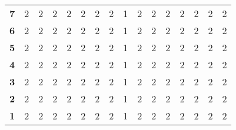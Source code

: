 \documentclass{article}
\begin{document}
\begin{table}[H]
\begin{tabular}{llllllllllllllll}
\multicolumn{1}{l|}{\textbf{7}}  & 2          & 2          & 2          & 2          & 2          & 2          & 2          & 1          & 2          & 2          & 2          & 2          & 2          & 2          & 2          \\
\multicolumn{1}{l|}{\textbf{6}}  & 2          & 2          & 2          & 2          & 2          & 2          & 2          & 1          & 2          & 2          & 2          & 2          & 2          & 2          & 2          \\
\multicolumn{1}{l|}{\textbf{5}}  & 2          & 2          & 2          & 2          & 2          & 2          & 2          & 1          & 2          & 2          & 2          & 2          & 2          & 2          & 2          \\
\multicolumn{1}{l|}{\textbf{4}}  & 2          & 2          & 2          & 2          & 2          & 2          & 2          & 1          & 2          & 2          & 2          & 2          & 2          & 2          & 2          \\
\multicolumn{1}{l|}{\textbf{3}}  & 2          & 2          & 2          & 2          & 2          & 2          & 2          & 1          & 2          & 2          & 2          & 2          & 2          & 2          & 2          \\
\multicolumn{1}{l|}{\textbf{2}}  & 2          & 2          & 2          & 2          & 2          & 2          & 2          & 1          & 2          & 2          & 2          & 2          & 2          & 2          & 2          \\
\multicolumn{1}{l|}{\textbf{1}}  & 2          & 2          & 2          & 2          & 2          & 2          & 2          & 1          & 2          & 2          & 2          & 2          & 2          & 2          & 2         
\end{tabular}
\end{table}
\end{document}
